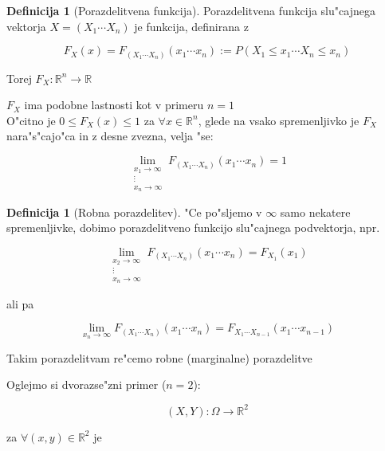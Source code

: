 \documentclass[a4paper,12pt]{article}
\theoremstyle{definition}
\newtheorem{defn}[counter]{Definicija}
\theoremstyle{remark}
\newcommand{\R}{\mathbb{R}}
\begin{document}
\begin{defn}[Porazdelitvena funkcija]
    Porazdelitvena funkcija slu"cajnega vektorja $X = (X_1 \cdots X_n)$ je funkcija, definirana z

    \begin{equation*}
        F_X(x) = F_{(X_1 \cdots X_n)}(x_1 \cdots x_n) := P(X_1 \leq x_1 \cdots X_n \leq x_n)
    \end{equation*}

    Torej $F_X: \R^n \to \R$
\end{defn}

$F_X$ ima podobne lastnosti kot v primeru $n=1$ \\
O"citno je $0 \leq F_X(x) \leq 1$ za $\forall x \in \R^n$, glede na vsako spremenljivko je $F_X$ nara"s"cajo"ca
in z desne zvezna, velja "se:

\begin{equation*}
    \lim_{\substack{x_1 \to \infty \\ \vdots \\ x_n \to \infty}} F_{(X_1 \cdots X_n)}(x_1 \cdots x_n) = 1
\end{equation*}

\begin{defn}[Robna porazdelitev]
    "Ce po"sljemo v $\infty$ samo nekatere spremenljivke, dobimo porazdelitveno funkcijo slu"cajnega podvektorja, npr.

    \begin{equation*}
        \lim_{\substack{x_2 \to \infty \\ \vdots \\ x_n \to \infty}} F_{(X_1 \cdots X_n)}(x_1 \cdots x_n) = F_{X_1}(x_1)
    \end{equation*}

    ali pa

    \begin{equation*}
        \lim_{x_n \to \infty} F_{(X_1 \cdots X_n)}(x_1 \cdots x_n) =
            F_{X_1 \cdots X_{n-1}}(x_1 \cdots x_{n-1})
    \end{equation*}

    Takim porazdelitvam re"cemo robne (marginalne) porazdelitve
\end{defn}

Oglejmo si dvorazse"zni primer ($n=2$):

\begin{equation*}
    (X,Y): \Omega \to \R^2
\end{equation*}

za $\forall (x,y) \in \R^2$ je 
\end{document}
